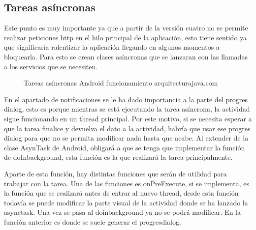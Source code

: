 \subsection{Tareas asíncronas}
\label{subsecc:Tareas asíncronas}

Este punto es muy importante ya que a partir de la versión cuatro no se permite realizar peticiones http en el hilo principal de la aplicación, esto tiene sentido ya que significaría ralentizar la aplicación llegando en algunos momentos a bloquearla.
Para esto se crean clases asíncronas que se lanzaran con las llamadas a los servicios que se necesiten.
\newpage
\begin{figure}[H] 
  \begin{center} 
    \caption{Tareas asíncronas Android funcionamiento arquitecturajava.com} 
    \label{fig:TareasAsincronas} 
  \end{center} 
\end{figure}

En el apartado de notificaciones se le ha dado importancia a la parte del progres dialog, esto es porque mientras se está ejecutando la tarea asíncrona, la actividad sigue funcionando en un thread principal. Por este motivo, si se necesita esperar a que la tarea finalice y devuelva el dato a la actividad, habría que usar ese progres dialog para que no se permita modificar nada hasta que acabe.
Al extender de la clase AsynTask de Android, obligará a que se tenga que implementar la función de doInbackground, esta función es la que realizará la tarea principalmente.

Aparte de esta función, hay distintas funciones que serán de utilidad para trabajar con la tarea.
Una de las funciones es onPreExecute, si se implementa, es la función que se realizará antes de entrar al nuevo thread, desde esta función todavía se puede modificar la parte visual de la actividad donde se ha lanzado la asynctask. Una vez se pasa al doinbackground ya no se podrá modificar.
En la función anterior es donde se suele generar el progresdialog.

